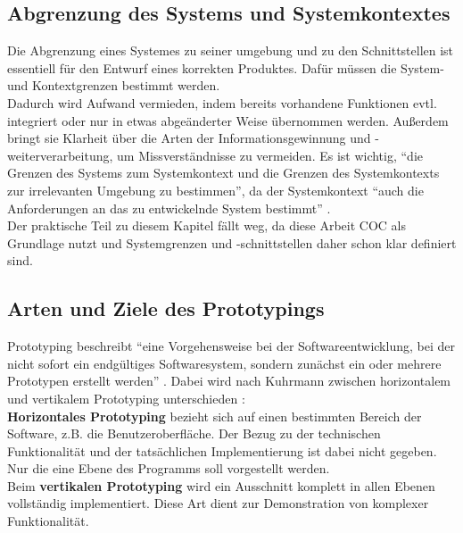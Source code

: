 \documentclass [12pt, a4paper, oneside, titlepage, ngerman]{article}
\begin{document}
\subsection{Abgrenzung des Systems und Systemkontextes}
Die Abgrenzung eines Systemes zu seiner umgebung und zu den Schnittstellen ist essentiell für den Entwurf eines korrekten Produktes. Dafür müssen die System- und Kontextgrenzen bestimmt werden. \\
Dadurch wird Aufwand vermieden, indem bereits vorhandene Funktionen evtl. integriert oder nur in etwas abgeänderter Weise übernommen werden. Außerdem bringt sie Klarheit über die Arten der Informationsgewinnung und -weiterverarbeitung, um Missverständnisse zu vermeiden. Es ist wichtig, "`die Grenzen des Systems zum Systemkontext und die Grenzen des Systemkontexts zur irrelevanten Umgebung zu bestimmen"'\cite[S.20]{PohlRupp2015}, da der Systemkontext "`auch die Anforderungen an das zu entwickelnde System bestimmt"' \cite[S.20]{PohlRupp2015}. \\
Der praktische Teil zu diesem Kapitel fällt weg, da diese Arbeit \ac{COC} als Grundlage nutzt und Systemgrenzen und -schnittstellen daher schon klar definiert sind. 

\subsection{Arten und Ziele des Prototypings}
Prototyping beschreibt "`eine Vorgehensweise bei der Softwareentwicklung, bei der nicht sofort ein endgültiges Softwaresystem, sondern zunächst ein oder mehrere Prototypen erstellt werden"' \cite[S.152]{gabler}. Dabei wird nach Kuhrmann zwischen horizontalem und vertikalem Prototyping unterschieden \cite[vgl.][]{Kuhrmann2012}: \\ 
\textbf{Horizontales Prototyping} bezieht sich auf einen bestimmten Bereich der Software, z.B. die Benutzeroberfläche. Der Bezug zu der technischen Funktionalität und der tatsächlichen Implementierung ist dabei nicht gegeben. Nur die eine Ebene des Programms soll vorgestellt werden.\\
Beim \textbf{vertikalen Prototyping} wird ein Ausschnitt komplett in allen Ebenen vollständig implementiert. Diese Art dient zur Demonstration von komplexer Funktionalität.\\
\end{document}
